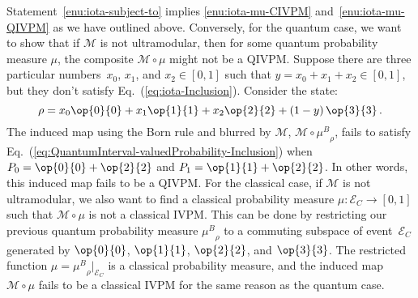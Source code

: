 \documentclass[english,reprint, aps, prl,superscriptaddress, showpacs,
showkeys, longbibliography, amsmath, amssymb, floatfix]{revtex4-1}
\theoremstyle{plain}
\theoremstyle{definition}
\newcommand{\events}{\ensuremath{\mathcal{E}}}
\newcommand{\proj}[1]{\op{#1}{#1}}
\newcommand{\ultramodular}{\mathcal{M}}
\newcommand{\muB}{\ensuremath{\mu^{B}}}
\newcommand{\eventsC}{\ensuremath{\events_{C}}}
\begin{document}
Statement~\ref{enu:iota-subject-to} implies \ref{enu:iota-mu-CIVPM}
and~\ref{enu:iota-mu-QIVPM} as we have outlined above. Conversely, for the quantum case, we want
to show that if $\ultramodular$ is not ultramodular, then for
some quantum probability measure $\mu$, the composite
$\ultramodular\circ\mu$ might not be a QIVPM. Suppose there are three
particular numbers~$x_{0}$, $x_{1}$, and $x_{2}\in\left[0,1\right]$
such that $y=x_{0}+x_{1}+x_{2}\in\left[0,1\right]$, but they don't
satisfy Eq.~(\ref{eq:iota-Inclusion}). Consider the state:
\[
\rho=x_{0}\proj{0}+x_{1}\proj{1}+x_{2}\proj{2}+\left(1-y\right)\proj{3}\,.
\]
The induced map using the Born rule and blurred by $\ultramodular$,
$\ultramodular\circ\muB_{\rho}$, fails to satisfy
Eq.~(\ref{eq:QuantumInterval-valuedProbability-Inclusion}) when
$P_{0}=\proj{0}+\proj{2}$ and $P_{1}=\proj{1}+\proj{2}$. In other
words, this induced map fails to be a QIVPM. For the classical case, if
$\ultramodular$ is not ultramodular, we also want to find a classical
probability measure $\mu:\eventsC\rightarrow\left[0,1\right]$ such
that $\ultramodular\circ\mu$ is not a classical IVPM. This can be
done by restricting our previous quantum probability measure
$\muB_{\rho}$ to a commuting subspace of
event~$\eventsC$ generated by $\proj{0}$, $\proj{1}$, $\proj{2}$,
and $\proj{3}$. The restricted function
$\mu=\muB_{\rho}|_{\eventsC}$ is a classical probability
measure, and the induced map $\ultramodular\circ\mu$ fails to be
a classical IVPM for the same reason as the quantum case.

\end{document}

